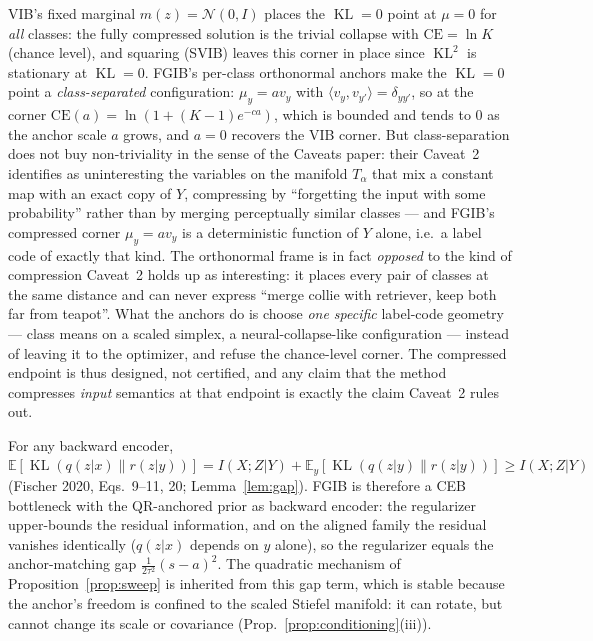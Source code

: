 \begin{remark}\label{rem:endpoint}
VIB's fixed marginal $m(z) = \mathcal{N}(0, I)$ places the $\operatorname{KL}=0$ point
at $\mu = 0$ for \emph{all} classes: the fully compressed solution is the trivial
collapse with $\mathrm{CE} = \ln K$ (chance level), and squaring (SVIB) leaves this
corner in place since $\operatorname{KL}^2$ is stationary at $\operatorname{KL}=0$.
FGIB's per-class orthonormal anchors make the $\operatorname{KL}=0$ point a
\emph{class-separated} configuration: $\mu_y = a v_y$ with
$\langle v_y, v_{y'}\rangle = \delta_{yy'}$, so at the corner
$\mathrm{CE}(a) = \ln(1 + (K-1)e^{-ca})$, which is bounded and tends to $0$ as the
anchor scale $a$ grows, and $a = 0$ recovers the VIB corner. But class-separation does
not buy non-triviality in the sense of the Caveats paper: their Caveat~2 identifies as
uninteresting the variables on the manifold $T_\alpha$ that mix a constant map with an
exact copy of $Y$, compressing by ``forgetting the input with some probability'' rather
than by merging perceptually similar classes --- and FGIB's compressed corner
$\mu_y = a v_y$ is a deterministic function of $Y$ alone, i.e.\ a label code of exactly
that kind. The orthonormal frame is in fact \emph{opposed} to the kind of compression
Caveat~2 holds up as interesting: it places every pair of classes at the same distance
and can never express ``merge collie with retriever, keep both far from teapot''. What
the anchors do is choose \emph{one specific} label-code geometry --- class means on a
scaled simplex, a neural-collapse-like configuration --- instead of leaving it to the
optimizer, and refuse the chance-level corner. The compressed endpoint is thus designed,
not certified, and any claim that the method compresses \emph{input} semantics at that
endpoint is exactly the claim Caveat~2 rules out.
\end{remark}

\begin{remark}\label{rem:residual}
For any backward encoder, $\mathbb{E}[\operatorname{KL}(q(z|x)\|r(z|y))]
= I(X;Z|Y) + \mathbb{E}_y[\operatorname{KL}(q(z|y)\|r(z|y))]
\ge I(X;Z|Y)$ (Fischer 2020, Eqs.~9--11, 20; Lemma~\ref{lem:gap}). FGIB is therefore a
CEB bottleneck with the QR-anchored prior as backward encoder: the regularizer
upper-bounds the residual information, and on the aligned family the residual vanishes
identically ($q(z|x)$ depends on $y$ alone), so the regularizer equals the
anchor-matching gap
$\tfrac{1}{2\tau^2}(s-a)^2$. The quadratic mechanism of Proposition~\ref{prop:sweep} is
inherited from this gap term, which is stable because the anchor's freedom is confined
to the scaled Stiefel manifold: it can rotate, but cannot change its scale or covariance
(Prop.~\ref{prop:conditioning}(iii)).
\end{remark}


